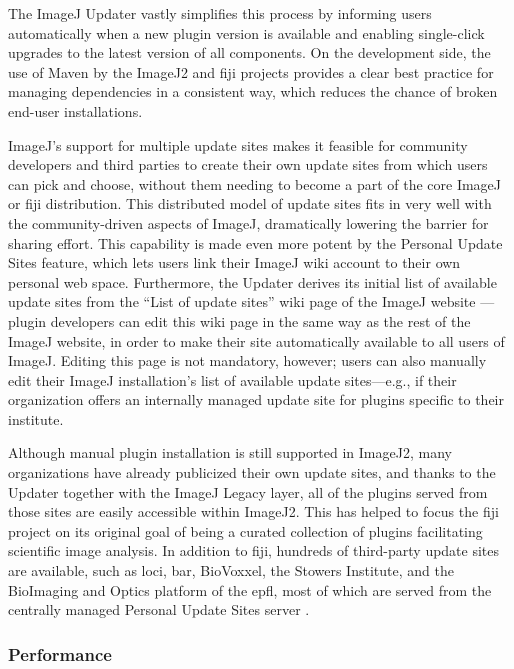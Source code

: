 \documentclass{bmcart}
\begin{document}
The ImageJ Updater vastly simplifies this process by informing users
automatically when a new plugin version is available and enabling single-click
upgrades to the latest version of all components. On the development side, the
use of Maven by the ImageJ2 and \acrshort{fiji} projects provides a clear best
practice for managing dependencies in a consistent way, which reduces the
chance of broken end-user installations.

ImageJ's support for multiple update sites makes it feasible for community
developers and third parties to create their own update sites from which users
can pick and choose, without them needing to become a part of the core ImageJ
or \acrshort{fiji} distribution. This distributed model of update sites fits in
very well with the community-driven aspects of ImageJ, dramatically lowering
the barrier for sharing effort. This capability is made even more potent by the
Personal Update Sites feature, which lets users link their ImageJ wiki account
to their own personal web space. Furthermore, the Updater derives its initial
list of available update sites from the ``List of update sites'' wiki page of
the ImageJ website \cite{imagej_list_of_update_sites}---plugin developers can
edit this wiki page in the same way as the rest of the ImageJ website, in order
to make their site automatically available to all users of ImageJ. Editing this
page is not mandatory, however; users can also manually edit their ImageJ
installation's list of available update sites---e.g., if their organization
offers an internally managed update site for plugins specific to their
institute.

Although manual plugin installation is still supported in ImageJ2, many
organizations have already publicized their own update sites, and thanks to the
Updater together with the ImageJ Legacy layer, all of the plugins served from
those sites are easily accessible within ImageJ2. This has helped to focus the
\acrshort{fiji} project on its original goal of being a curated collection of
plugins facilitating scientific image analysis. In addition to \acrshort{fiji},
hundreds of third-party update sites are available, such as \acrshort{loci},
\acrfull{bar}, BioVoxxel, the Stowers Institute, and the BioImaging and Optics
platform of the \acrfull{epfl}, most of which are served from the centrally
managed Personal Update Sites server \cite{imagej_sites}.

\subsubsection*{Performance}
\end{document}
